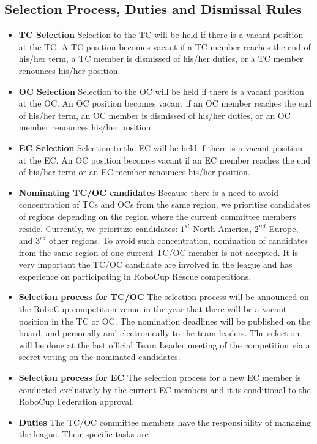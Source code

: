 \documentclass{article}
\begin{document}
\subsection{Selection Process, Duties and Dismissal Rules}
\begin{itemize}
  \item \textbf{TC Selection} Selection to the TC will be held if there is a vacant position at the TC. A TC position becomes vacant if a TC member reaches the end of his/her term, a TC member is dismissed of his/her duties, or a TC member renounces his/her position.
  \item \textbf{OC Selection} Selection to the OC will be held if there is a vacant position at the OC. An OC position becomes vacant if an OC member reaches the end of his/her term, an OC member is dismissed of his/her duties, or an OC member renounces his/her position.
  \item \textbf{EC Selection} Selection to the EC will be held if there is a vacant position at the EC. An OC position becomes vacant if an EC member reaches the end of his/her term or an EC member renounces his/her position.
  \item \textbf{Nominating TC/OC candidates} Because there is a need to avoid concentration of TCs and OCs from the same region, we prioritize candidates of regions depending on the region where the current committee members reside. Currently, we prioritize candidates: $1^{st}$ North America, $2^{nd}$ Europe, and $3^{rd}$ other regions. To avoid such concentration, nomination of candidates from the same region of one current TC/OC member is not accepted. It is very important the TC/OC candidate are involved in the league and has experience on participating in RoboCup Rescue competitions.
  \item \textbf{Selection process for TC/OC} The selection process will be announced on the RoboCup competition venue in the year that there will be a vacant position in the TC or OC. The nomination deadlines will be published on the board, and personally and electronically to the team leaders. The selection will be done at the last official Team Leader meeting of the competition via a secret voting on the nominated candidates.
  \item \textbf{Selection process for EC} The selection process for a new EC member is conducted exclusively by the current EC members and it is conditional to the RoboCup Federation approval.
  \item \textbf{Duties} The TC/OC committee members have the responsibility of managing the league. Their specific tasks are

\end{itemize}
\end{document}
